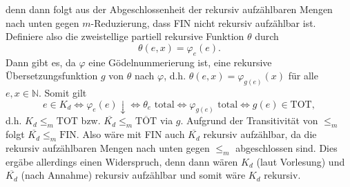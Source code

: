 \documentclass[german,headsepline]{scrartcl}
\begin{document}
\begin{solution}
\begin{enumerate}[(a)]
				denn dann folgt aus der Abgeschlossenheit der rekursiv aufzählbaren Mengen nach unten gegen $m$-Reduzierung,
				dass FIN nicht rekursiv aufzählbar ist.
				Definiere also die zweistellige partiell rekursive Funktion $\theta$ durch
				\[\theta(e,x)=\varphi_e(e).\]
				Dann gibt es, da $\varphi$ eine Gödelnummerierung ist,
				eine rekursive Übersetzungsfunktion $g$ von $\theta$ nach $\varphi$,
				d.h. $\theta(e,x)=\varphi_{g(e)}(x)$ für alle $e,x\in\mathbb{N}$.
				Somit gilt \[
					e\in K_d
					\Leftrightarrow\varphi_e(e)\downarrow
					\Leftrightarrow\theta_e\text{ total}
					\Leftrightarrow\varphi_{g(e)}\text{ total}
					\Leftrightarrow g(e)\in\text{TOT},
				\]
				d.h. $K_d\leq_m\text{TOT}$ bzw. $\overline{K_d}\leq_m\overline{\text{TOT}}$ via $g$.
				Aufgrund der Transitivität von $\leq_m$ folgt $\overline{K_d}\leq_m\text{FIN}$.
				Also wäre mit FIN auch $\overline{K_d}$ rekursiv aufzählbar,
				da die rekursiv aufzählbaren Mengen nach unten gegen $\leq_m$ abgeschlossen sind.
				Dies ergäbe allerdings einen Widerspruch,
				denn dann wären $K_d$ (laut Vorlesung) und $\overline{K_d}$ (nach Annahme) rekursiv aufzählbar und somit wäre $K_d$ rekursiv.
		\end{enumerate}
	\end{solution}
	
\end{document}
